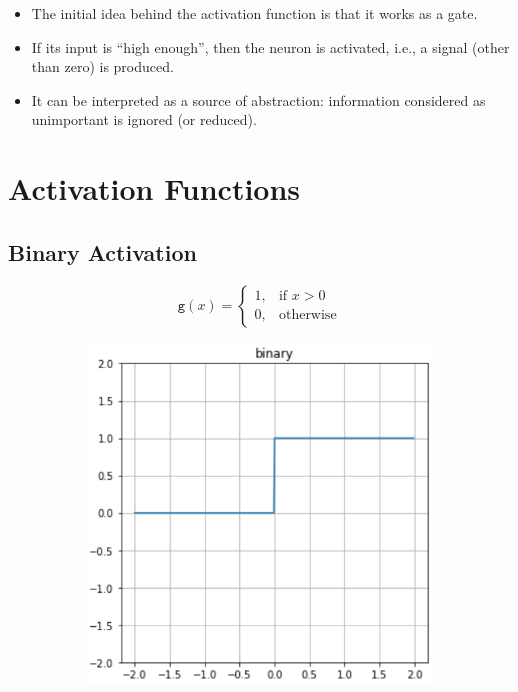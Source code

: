 \documentclass{book}
\newcommand{\act}{\texttt{g}}%
\begin{document}
\begin{itemize}
\item The initial idea behind the activation function is that it works as a gate.
\item If its input is ``high enough'', then the neuron is activated, i.e., a signal (other than zero) is produced.
\item It can be interpreted as a source of abstraction: information considered as unimportant is ignored (or reduced).
\end{itemize}

\section{Activation Functions}

\subsection{Binary Activation}

\begin{figure}[h]
    \centering
    \begin{subfigure}{.5\textwidth}
        \[
        \act(x)=
        \begin{cases}
        1, & \text{if } x > 0\\
        0, & \text{otherwise}
        \end{cases}
        \]
    \end{subfigure}
    \begin{subfigure}{.5\textwidth}
        \includegraphics[width=.8\textwidth]{act_bin.png}
    \end{subfigure}
\end{figure}
\end{document}
